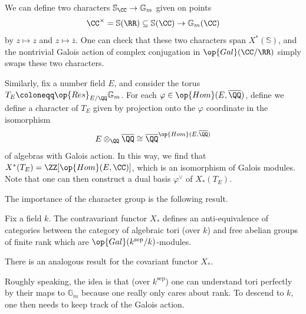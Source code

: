 \documentclass{article}
\begin{document}
\begin{example} \label{ex:char-s}
	We can define two characters $\mathbb S_\CC\to\mathbb G_m$ given on points
	\[\CC^\times=\mathbb S(\RR)\subseteq\mathbb S(\CC)\to\mathbb G_m(\CC)\]
	by $z\mapsto z$ and $z\mapsto\overline z$. One can check that these two characters span $X^*(\mathbb S)$, and the nontrivial Galois action of complex conjugation in $\op{Gal}(\CC/\RR)$ simply swaps these two characters.
\end{example}
\begin{example}
	Similarly, fix a number field $E$, and consider the torus $T_E\coloneqq\op{Res}_{E/\QQ}\mathbb G_m$. For each $\varphi\in\op{Hom}(E,\overline\QQ)$, define we define a character of $T_E$ given by projection onto the $\varphi$ coordinate in the isomorphism
	\[E\otimes_\QQ\overline\QQ\cong\overline\QQ^{\op{Hom}(E,\overline\QQ)}\]
	of algebras with Galois action. In this way, we find that $X^*(T_E)=\ZZ[\op{Hom}(E,\CC)]$, which is an isomorphism of Galois modules. Note that one can then construct a dual basis $\varphi^\lor$ of $X_*(T_E)$.
\end{example}
The importance of the character group is the following result.
\begin{theorem}
	Fix a field $k$. The contravariant functor $X_*$ defines an anti-equivalence of categories between the category of algebraic tori (over $k$) and free abelian groups of finite rank which are $\op{Gal}(k^{\mathrm{sep}}/k)$-modules.
\end{theorem}
\begin{remark}
	There is an analogous result for the covariant functor $X_*$.
\end{remark}
Roughly speaking, the idea is that (over $k^{\mathrm{sep}}$) one can understand tori perfectly by their maps to $\mathbb G_m$ because one really only cares about rank. To descend to $k$, one then needs to keep track of the Galois action.
\end{document}
